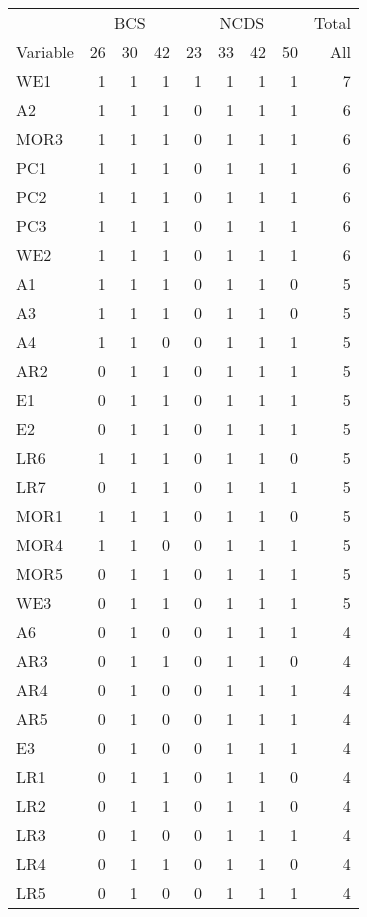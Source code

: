 
\begin{tabular}{lrrrrrrrr}
\toprule
\multicolumn{1}{c}{} & \multicolumn{3}{c}{BCS} & \multicolumn{4}{c}{NCDS} & \multicolumn{1}{c}{Total} \\
\cmidrule(l{3pt}r{3pt}){2-4} \cmidrule(l{3pt}r{3pt}){5-8} \cmidrule(l{3pt}r{3pt}){9-9}
Variable & 26 & 30 & 42 & 23 & 33 & 42 & 50 & All\\
\midrule
WE1 & 1 & 1 & 1 & 1 & 1 & 1 & 1 & 7\\
A2 & 1 & 1 & 1 & 0 & 1 & 1 & 1 & 6\\
MOR3 & 1 & 1 & 1 & 0 & 1 & 1 & 1 & 6\\
PC1 & 1 & 1 & 1 & 0 & 1 & 1 & 1 & 6\\
PC2 & 1 & 1 & 1 & 0 & 1 & 1 & 1 & 6\\
PC3 & 1 & 1 & 1 & 0 & 1 & 1 & 1 & 6\\
WE2 & 1 & 1 & 1 & 0 & 1 & 1 & 1 & 6\\
A1 & 1 & 1 & 1 & 0 & 1 & 1 & 0 & 5\\
A3 & 1 & 1 & 1 & 0 & 1 & 1 & 0 & 5\\
A4 & 1 & 1 & 0 & 0 & 1 & 1 & 1 & 5\\
AR2 & 0 & 1 & 1 & 0 & 1 & 1 & 1 & 5\\
E1 & 0 & 1 & 1 & 0 & 1 & 1 & 1 & 5\\
E2 & 0 & 1 & 1 & 0 & 1 & 1 & 1 & 5\\
LR6 & 1 & 1 & 1 & 0 & 1 & 1 & 0 & 5\\
LR7 & 0 & 1 & 1 & 0 & 1 & 1 & 1 & 5\\
MOR1 & 1 & 1 & 1 & 0 & 1 & 1 & 0 & 5\\
MOR4 & 1 & 1 & 0 & 0 & 1 & 1 & 1 & 5\\
MOR5 & 0 & 1 & 1 & 0 & 1 & 1 & 1 & 5\\
WE3 & 0 & 1 & 1 & 0 & 1 & 1 & 1 & 5\\
A6 & 0 & 1 & 0 & 0 & 1 & 1 & 1 & 4\\
AR3 & 0 & 1 & 1 & 0 & 1 & 1 & 0 & 4\\
AR4 & 0 & 1 & 0 & 0 & 1 & 1 & 1 & 4\\
AR5 & 0 & 1 & 0 & 0 & 1 & 1 & 1 & 4\\
E3 & 0 & 1 & 0 & 0 & 1 & 1 & 1 & 4\\
LR1 & 0 & 1 & 1 & 0 & 1 & 1 & 0 & 4\\
LR2 & 0 & 1 & 1 & 0 & 1 & 1 & 0 & 4\\
LR3 & 0 & 1 & 0 & 0 & 1 & 1 & 1 & 4\\
LR4 & 0 & 1 & 1 & 0 & 1 & 1 & 0 & 4\\
LR5 & 0 & 1 & 0 & 0 & 1 & 1 & 1 & 4\\

\end{tabular}
